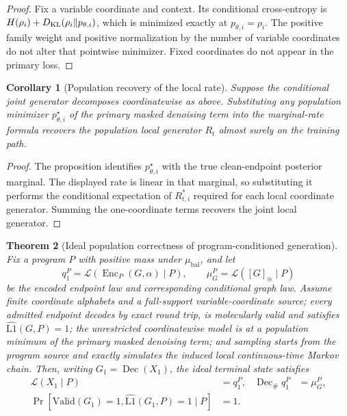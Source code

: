 \documentclass{article}
\newtheorem{theorem}{Theorem}[section]
\newtheorem{corollary}[theorem]{Corollary}
\begin{document}
\begin{proof}
Fix a variable coordinate and context. Its conditional cross-entropy is
$H(\rho_i)+D_{\rm KL}(\rho_i\Vert p_{\theta,i})$, which is minimized exactly at
$p_{\theta,i}=\rho_i$. The positive family weight and positive normalization by the number of
variable coordinates do not alter that pointwise minimizer. Fixed coordinates do not appear in the
primary loss.
\end{proof}

\begin{corollary}[Population recovery of the local rate]
\label{cor:local-rate-recovery}
Suppose the conditional joint generator decomposes coordinatewise as above. Substituting any
population minimizer $p_{\theta,i}^\star$ of the primary masked denoising term into the marginal-rate
formula recovers the population local generator $R_t$ almost surely on the training path.
\end{corollary}

\begin{proof}
The proposition identifies $p_{\theta,i}^\star$ with the true clean-endpoint posterior marginal.
The displayed rate is linear in that marginal, so substituting it performs the conditional
expectation of $R^*_{t,i}$ required for each local coordinate generator. Summing the one-coordinate
terms recovers the joint local generator.
\end{proof}

\begin{theorem}[Ideal population correctness of program-conditioned generation]
\label{thm:ideal-terminal-law}
Fix a program $P$ with positive mass under $\mu_{\mathrm{bal}}$, and let
\begin{equation}
 q_1^P=\mathcal L\!\left(\operatorname{Enc}_P(G,\alpha)\mid P\right),
 \qquad
 \mu_G^P=\mathcal L\!\left([G]_{\cong}\mid P\right)
\end{equation}
be the encoded endpoint law and corresponding conditional graph law. Assume finite coordinate
alphabets and a full-support variable-coordinate source; every admitted endpoint decodes by exact
round trip, is molecularly valid and satisfies $\widehat{\mathrm{L1}}(G,P)=1$; the unrestricted
coordinatewise model is at a population minimum of the primary masked denoising term; and sampling
starts from the program source and exactly simulates the induced local continuous-time Markov chain.
Then, writing $G_1=\operatorname{Dec}(X_1)$, the ideal terminal state satisfies
\begin{align}
 \mathcal L(X_1\mid P)&=q_1^P,
 &\operatorname{Dec}_{\#}q_1^P&=\mu_G^P,\\
 \Pr\!\left[\mathrm{Valid}(G_1)=1,
 \widehat{\mathrm{L1}}(G_1,P)=1\mid P\right]&=1.
\end{align}
\end{theorem}
\end{document}
